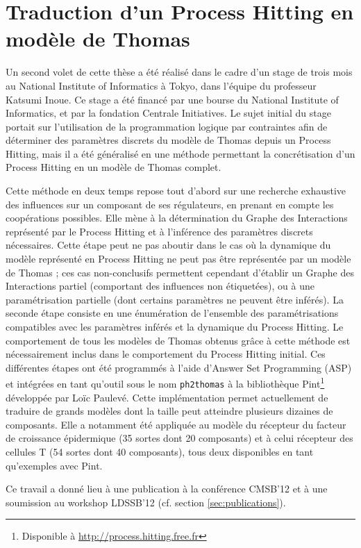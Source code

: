 
\section{Traduction d'un Process Hitting en modèle de Thomas}\label{sec:traduction}
Un second volet de cette thèse a été réalisé dans le cadre d'un stage de trois mois au National Institute of Informatics à Tokyo, dans l'équipe du professeur Katsumi Inoue.
Ce stage a été financé par une bourse du National Institute of Informatics, et par la fondation Centrale Initiatives.
Le sujet initial du stage portait sur l'utilisation de la programmation logique par contraintes afin de déterminer des paramètres discrets du modèle de Thomas depuis un Process Hitting, mais il a été généralisé en une méthode permettant la concrétisation d'un Process Hitting en un modèle de Thomas complet.

Cette méthode en deux temps repose tout d'abord sur une recherche exhaustive des influences sur un composant de ses régulateurs, en prenant en compte les coopérations possibles.
Elle mène à la détermination du Graphe des Interactions représenté par le Process Hitting et à l'inférence des paramètres discrets nécessaires.
Cette étape peut ne pas aboutir dans le cas où la dynamique du modèle représenté en Process Hitting ne peut pas être représentée par un modèle de Thomas ;
ces cas non-conclusifs permettent cependant d'établir un Graphe des Interactions partiel (comportant des influences non étiquetées), ou à une paramétrisation partielle (dont certains paramètres ne peuvent être inférés).
La seconde étape consiste en une énumération de l'ensemble des paramétrisations compatibles avec les paramètres inférés et la dynamique du Process Hitting.
Le comportement de tous les modèles de Thomas obtenus grâce à cette méthode est nécessairement inclus dans le comportement du Process Hitting initial.
Ces différentes étapes ont été programmés à l'aide d'Answer Set Programming (ASP) et intégrées en tant qu'outil sous le nom \texttt{ph2thomas} à la bibliothèque Pint\footnote{Disponible à \url{http://process.hitting.free.fr}} développée par Loïc Paulevé.
Cette implémentation permet actuellement de traduire de grands modèles dont la taille peut atteindre plusieurs dizaines de composants.
Elle a notamment été appliquée au modèle du récepteur du facteur de croissance épidermique (35 sortes dont 20 composants) et à celui récepteur des cellules T (54 sortes dont 40 composants), tous deux disponibles en tant qu'exemples avec Pint.

Ce travail a donné lieu à une publication \cite{FPIMR12-CMSB} à la conférence CMSB'12 et à une soumission au workshop LDSSB'12 (cf. section \ref{sec:publications}).
